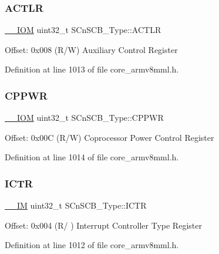 \subsubsection{\texorpdfstring{A\+C\+T\+LR}{ACTLR}}
{\footnotesize\ttfamily \hyperlink{core__sc300_8h_ab6caba5853a60a17e8e04499b52bf691}{\+\_\+\+\_\+\+I\+OM} uint32\+\_\+t S\+Cn\+S\+C\+B\+\_\+\+Type\+::\+A\+C\+T\+LR}

Offset\+: 0x008 (R/W) Auxiliary Control Register 

Definition at line 1013 of file core\+\_\+armv8mml.\+h.

\mbox{\label{struct_s_cn_s_c_b___type_a356efebfcbdaecaf1176e6cd86a60bf1}} 
\subsubsection{\texorpdfstring{C\+P\+P\+WR}{CPPWR}}
{\footnotesize\ttfamily \hyperlink{core__sc300_8h_ab6caba5853a60a17e8e04499b52bf691}{\+\_\+\+\_\+\+I\+OM} uint32\+\_\+t S\+Cn\+S\+C\+B\+\_\+\+Type\+::\+C\+P\+P\+WR}

Offset\+: 0x00C (R/W) Coprocessor Power Control Register 

Definition at line 1014 of file core\+\_\+armv8mml.\+h.

\mbox{\label{struct_s_cn_s_c_b___type_a34ec1d771245eb9bd0e3ec9336949762}} 
\subsubsection{\texorpdfstring{I\+C\+TR}{ICTR}}
{\footnotesize\ttfamily \hyperlink{core__sc300_8h_a4cc1649793116d7c2d8afce7a4ffce43}{\+\_\+\+\_\+\+IM} uint32\+\_\+t S\+Cn\+S\+C\+B\+\_\+\+Type\+::\+I\+C\+TR}

Offset\+: 0x004 (R/ ) Interrupt Controller Type Register 

Definition at line 1012 of file core\+\_\+armv8mml.\+h.

\mbox{\label{struct_s_cn_s_c_b___type_a758b3cae751b227e20698256b6249dd4}} 
